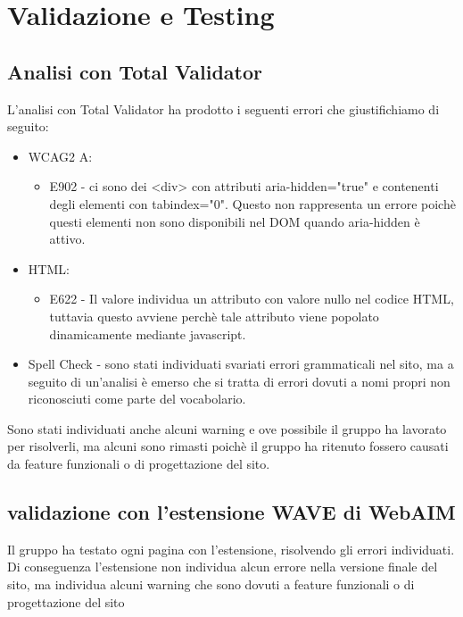 \section{Validazione e Testing}
\subsection{Analisi con Total Validator}
L'analisi con Total Validator ha prodotto i seguenti errori che giustifichiamo di seguito:
\begin{itemize}
    \item WCAG2 A:
    \begin{itemize}
        \item E902 - ci sono dei <div> con attributi aria-hidden="true" e contenenti degli elementi con tabindex="0". Questo non rappresenta un errore poichè questi elementi non sono disponibili nel DOM quando aria-hidden è attivo.
    \end{itemize}
    \item HTML:
    \begin{itemize}
        \item E622 - Il valore individua un attributo con valore nullo nel codice HTML, tuttavia questo avviene perchè tale attributo viene popolato dinamicamente mediante javascript.
    \end{itemize}
    \item Spell Check - sono stati individuati svariati errori grammaticali nel sito, ma a seguito di un'analisi è emerso che si tratta di errori dovuti a nomi propri non riconosciuti come parte del vocabolario.
\end{itemize}
Sono stati individuati anche alcuni warning e ove possibile il gruppo ha lavorato per risolverli, ma alcuni sono rimasti poichè il gruppo ha ritenuto fossero causati da feature funzionali o di progettazione del sito.
\subsection{validazione con l'estensione WAVE di WebAIM}
Il gruppo ha testato ogni pagina con l'estensione, risolvendo gli errori individuati. Di conseguenza l'estensione non individua alcun errore nella versione finale del sito, ma individua alcuni warning che sono dovuti a feature funzionali o di progettazione del sito

